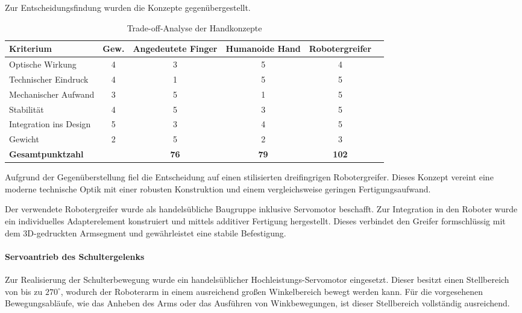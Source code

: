 Zur Entscheidungsfindung wurden die Konzepte gegenübergestellt.

\begin{table}[H]
	\centering
	\caption{Trade-off-Analyse der Handkonzepte}
	\label{tab:tradeoff_hand}
	\renewcommand{\arraystretch}{1.2}
	\begin{tabular}{lccccc}
		\toprule
		\textbf{Kriterium} & \textbf{Gew.} &
		\textbf{Angedeutete Finger} &
		\textbf{Humanoide Hand} &
		\textbf{Robotergreifer} \\
		\midrule
		Optische Wirkung          & 4 & 3 & 5 & 4 \\
		Technischer Eindruck      & 4 & 1 & 5 & 5 \\
		Mechanischer Aufwand      & 3 & 5 & 1 & 5 \\
		Stabilität                & 4 & 5 & 3 & 5 \\
		Integration ins Design    & 5 & 3 & 4 & 5 \\
		Gewicht                   & 2 & 5 & 2 & 3 \\
		\midrule
		\textbf{Gesamtpunktzahl} &
		&
		\textbf{76} &
		\textbf{79} &
		\textbf{102} \\
		\bottomrule
	\end{tabular}
\end{table}

Aufgrund der Gegenüberstellung fiel die Entscheidung auf einen stilisierten dreifingrigen Robotergreifer. Dieses Konzept vereint eine moderne technische Optik mit einer robusten Konstruktion und einem vergleichsweise geringen Fertigungsaufwand. 

Der verwendete Robotergreifer wurde als handelsübliche Baugruppe inklusive Servomotor beschafft. Zur Integration in den Roboter wurde ein individuelles Adapterelement konstruiert und mittels additiver Fertigung hergestellt. Dieses verbindet den Greifer formschlüssig mit dem 3D-gedruckten Armsegment und gewährleistet eine stabile Befestigung.

\paragraph{Servoantrieb des Schultergelenks}

Zur Realisierung der Schulterbewegung wurde ein handelsüblicher Hochleistungs-Servomotor eingesetzt. Dieser besitzt einen Stellbereich von bis zu $270^\circ$, wodurch der Roboterarm in einem ausreichend großen Winkelbereich bewegt werden kann. Für die vorgesehenen Bewegungsabläufe, wie das Anheben des Arms oder das Ausführen von Winkbewegungen, ist dieser Stellbereich vollständig ausreichend.

